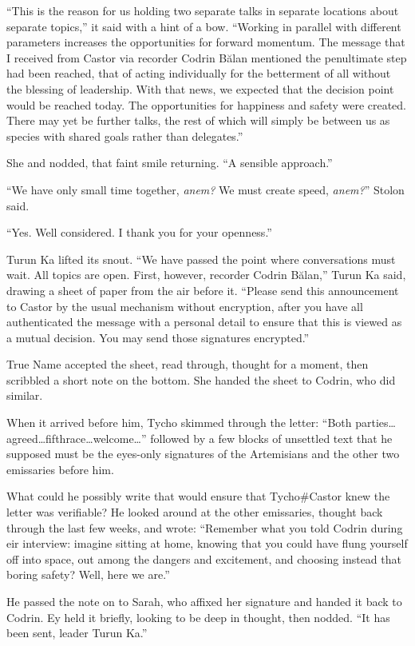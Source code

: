 ``This is the reason for us holding two separate talks in separate locations about separate topics,'' it said with a hint of a bow. ``Working in parallel with different parameters increases the opportunities for forward momentum. The message that I received from Castor via recorder Codrin Bălan mentioned the penultimate step had been reached, that of acting individually for the betterment of all without the blessing of leadership. With that news, we expected that the decision point would be reached today. The opportunities for happiness and safety were created. There may yet be further talks, the rest of which will simply be between us as species with shared goals rather than delegates.''

She and nodded, that faint smile returning. ``A sensible approach.''

``We have only small time together, \emph{anem?} We must create speed, \emph{anem?}'' Stolon said.

``Yes. Well considered. I thank you for your openness.''

Turun Ka lifted its snout. ``We have passed the point where conversations must wait. All topics are open. First, however, recorder Codrin Bălan,'' Turun Ka said, drawing a sheet of paper from the air before it. ``Please send this announcement to Castor by the usual mechanism without encryption, after you have all authenticated the message with a personal detail to ensure that this is viewed as a mutual decision. You may send those signatures encrypted.''

True Name accepted the sheet, read through, thought for a moment, then scribbled a short note on the bottom. She handed the sheet to Codrin, who did similar.

When it arrived before him, Tycho skimmed through the letter: ``Both parties\ldots agreed\ldots fifthrace\ldots welcome\ldots{}'' followed by a few blocks of unsettled text that he supposed must be the eyes-only signatures of the Artemisians and the other two emissaries before him.

What could he possibly write that would ensure that Tycho\#Castor knew the letter was verifiable? He looked around at the other emissaries, thought back through the last few weeks, and wrote: ``Remember what you told Codrin during eir interview: imagine sitting at home, knowing that you could have flung yourself off into space, out among the dangers and excitement, and choosing instead that boring safety? Well, here we are.''

He passed the note on to Sarah, who affixed her signature and handed it back to Codrin. Ey held it briefly, looking to be deep in thought, then nodded. ``It has been sent, leader Turun Ka.''

